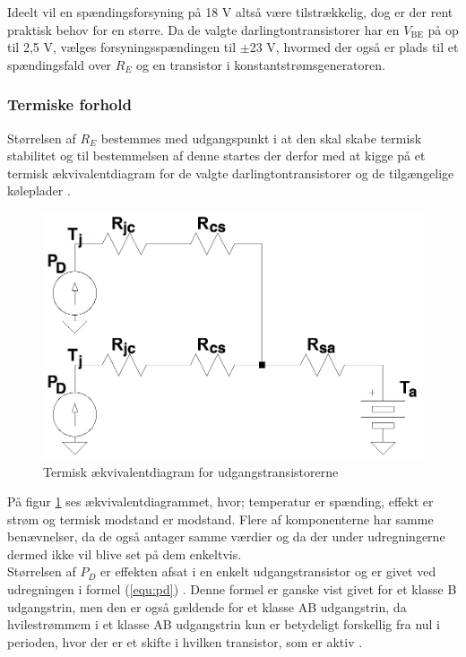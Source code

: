 Ideelt vil en spændingsforsyning på 18 V altså være tilstrækkelig, dog er der rent praktisk behov for en større. Da de valgte darlingtontransistorer har en $V_{\mathrm{BE}}$ på op til 2,5 V, vælges forsyningsspændingen til $\pm$23 V, hvormed der også er plads til et spændingsfald over $R_E$ og en transistor i konstantstrømsgeneratoren.

\subsubsection*{Termiske forhold}
Størrelsen af $R_E$ bestemmes med udgangspunkt i at den skal skabe termisk stabilitet og til bestemmelsen af denne startes der derfor med at kigge på et termisk ækvivalentdiagram for de valgte darlingtontransistorer og de tilgængelige køleplader \cite{koeleplade-datablad}. 

\begin{figure}[h]
\centering
\includegraphics[scale=0.2]{teknisk/effektforstaerker/termisk_ekvivalentdiagram.png}
\caption{Termisk ækvivalentdiagram for udgangstransistorerne}
\label{fig:term-dia}
\end{figure}

På figur \ref{fig:term-dia} ses ækvivalentdiagrammet, hvor; temperatur er spænding, effekt er strøm og termisk modstand er modstand. Flere af komponenterne har samme benævnelser, da de også antager samme værdier og da der under udregningerne dermed ikke vil blive set på dem enkeltvis.\\
Størrelsen af $P_D$ er effekten afsat i en enkelt udgangstransistor og er givet ved udregningen i formel (\ref{equ:pd}) \cite{ael-mm19}. Denne formel er ganske vist givet for et klasse B udgangstrin, men den er også gældende for et klasse AB udgangstrin, da hvilestrømmem i et klasse AB udgangstrin kun er betydeligt forskellig fra nul i perioden, hvor der er et skifte i hvilken transistor, som er aktiv \cite{klasse-ab}.

